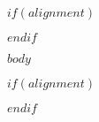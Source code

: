 \documentclass[12pt]{article}
\begin{document}
\maketitle

\tableofcontents



$if(alignment)$
\begin{$alignment$}
$endif$

$body$

$if(alignment)$
\end{$alignment$}
$endif$
\end{document}
